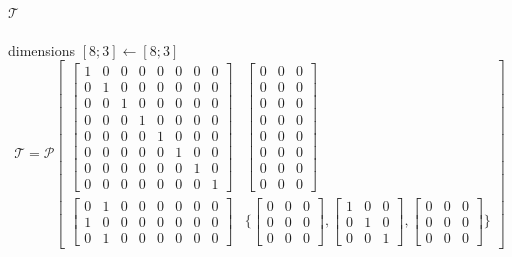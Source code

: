 \documentclass{article}
\newcommand{\PIop}[6]{\mathcal P\!\left[\begin{array}{c|c}#1&#2\\\hline#3&\{#4,#5,#6\}\end{array}\right]}
\begin{document}
\paragraph{$\mathcal T$}\hfill dimensions $[8;3]\leftarrow[8;3]$
\[\displaystyle \mathcal T=\PIop{\begin{bmatrix}1 & 0 & 0 & 0 & 0 & 0 & 0 & 0\\0 & 1 & 0 & 0 & 0 & 0 & 0 & 0\\0 & 0 & 1 & 0 & 0 & 0 & 0 & 0\\0 & 0 & 0 & 1 & 0 & 0 & 0 & 0\\0 & 0 & 0 & 0 & 1 & 0 & 0 & 0\\0 & 0 & 0 & 0 & 0 & 1 & 0 & 0\\0 & 0 & 0 & 0 & 0 & 0 & 1 & 0\\0 & 0 & 0 & 0 & 0 & 0 & 0 & 1\end{bmatrix}}{\begin{bmatrix}0 & 0 & 0\\0 & 0 & 0\\0 & 0 & 0\\0 & 0 & 0\\0 & 0 & 0\\0 & 0 & 0\\0 & 0 & 0\\0 & 0 & 0\end{bmatrix}}{\begin{bmatrix}0 & 1 & 0 & 0 & 0 & 0 & 0 & 0\\1 & 0 & 0 & 0 & 0 & 0 & 0 & 0\\0 & 1 & 0 & 0 & 0 & 0 & 0 & 0\end{bmatrix}}{\begin{bmatrix}0 & 0 & 0\\0 & 0 & 0\\0 & 0 & 0\end{bmatrix}}{\begin{bmatrix}1 & 0 & 0\\0 & 1 & 0\\0 & 0 & 1\end{bmatrix}}{\begin{bmatrix}0 & 0 & 0\\0 & 0 & 0\\0 & 0 & 0\end{bmatrix}}\]
\end{document}
